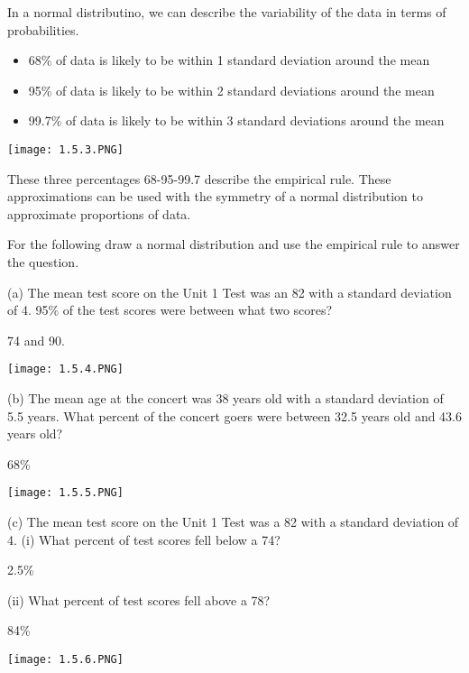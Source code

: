 \documentclass[../stats.tex]{subfiles}
\begin{document}
In a normal distributino, we can describe the variability of the data in terms of probabilities.
\begin{itemize}
    \item 68\% of data is likely to be within 1 standard deviation around the mean 
    \item 95\% of data is likely to be within 2 standard deviations around the mean 
    \item 99.7\% of data is likely to be within 3 standard deviations around the mean 
\end{itemize}
\begin{center}
    \texttt{[image: 1.5.3.PNG]}
\end{center}
These three percentages 68-95-99.7 describe the empirical rule. These approximations can be used with the symmetry of a normal distribution to approximate proportions of data.

\begin{example}
    For the following draw a normal distribution and use the empirical rule to answer the question.

    (a) The mean test score on the Unit 1 Test was an 82 with a standard deviation of 4. 95\% of the test scores were between what two scores?

    74 and 90.
    \begin{center}
        \texttt{[image: 1.5.4.PNG]}
    \end{center}

    (b) The mean age at the concert was 38 years old with a standard deviation of 5.5 years. What percent of the concert goers were between 32.5 years old and 43.6 years old?

    68\%
    \begin{center}
        \texttt{[image: 1.5.5.PNG]}
    \end{center}

    (c) The mean test score on the Unit 1 Test was a 82 with a standard deviation of 4.
    (i) What percent of test scores fell below a 74?

    2.5\%

    (ii) What percent of test scores fell above a 78?

    84\%
    \begin{center}
        \texttt{[image: 1.5.6.PNG]}
    \end{center}
\end{example}
\end{document}

